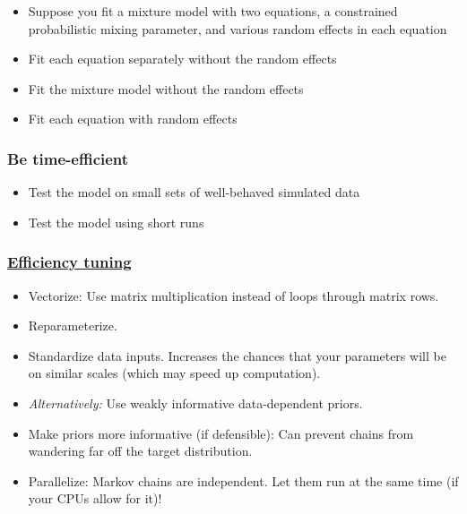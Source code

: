 \documentclass[
  11pt,
]{article}
\providecommand{\tightlist}{%
  \setlength{\itemsep}{0pt}\setlength{\parskip}{0pt}}
\begin{document}
\begin{itemize}
\tightlist
\item
  Suppose you fit a mixture model with two equations, a constrained probabilistic mixing parameter, and various random effects in each equation
\item
  Fit each equation separately without the random effects
\item
  Fit the mixture model without the random effects
\item
  Fit each equation with random effects
\end{itemize}

\hypertarget{be-time-efficient}{%
\subsubsection{Be time-efficient}\label{be-time-efficient}}

\begin{itemize}
\tightlist
\item
  Test the model on small sets of well-behaved simulated data
\item
  Test the model using short runs
\end{itemize}

\hypertarget{efficiency-tuning}{%
\subsubsection{\texorpdfstring{\href{https://mc-stan.org/docs/2_26/stan-users-guide/optimization-chapter.html}{Efficiency tuning}}{Efficiency tuning}}\label{efficiency-tuning}}

\begin{itemize}
\tightlist
\item
  Vectorize: Use matrix multiplication instead of loops through matrix rows.
\item
  Reparameterize.
\item
  Standardize data inputs. Increases the chances that your parameters will be on similar scales (which may speed up computation).
\item
  \emph{Alternatively:} Use weakly informative data-dependent priors.
\item
  Make priors more informative (if defensible): Can prevent chains from wandering far off the target distribution.
\item
  Parallelize: Markov chains are independent. Let them run at the same time (if your CPUs allow for it)!
\end{itemize}
\end{document}
